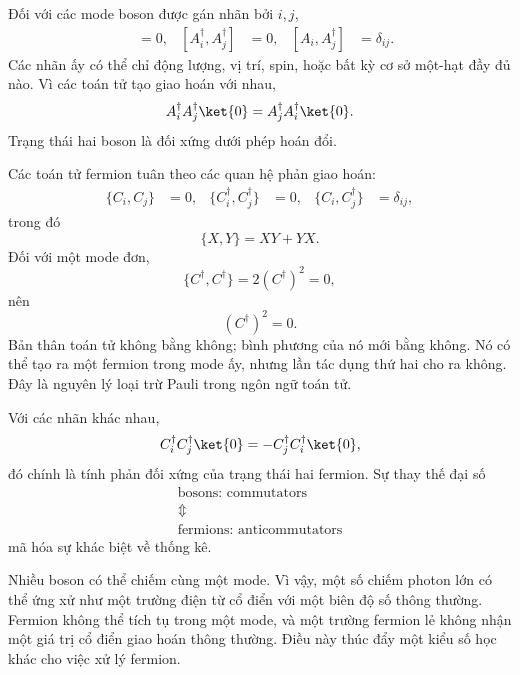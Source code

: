 Đối với các mode boson được gán nhãn bởi \(i,j\),
\begin{align}
[A_i,A_j]&=0,&
[A_i^\dagger,A_j^\dagger]&=0,&
[A_i,A_j^\dagger]&=\delta_{ij}.
\end{align}
Các nhãn ấy có thể chỉ động lượng, vị trí, spin, hoặc bất kỳ cơ sở một-hạt đầy đủ nào. Vì các toán tử tạo giao hoán với nhau,
\begin{equation}
A_i^\dagger A_j^\dagger\ket{0}
=A_j^\dagger A_i^\dagger\ket{0}.
\end{equation}
Trạng thái hai boson là đối xứng dưới phép hoán đổi.

Các toán tử fermion tuân theo các quan hệ phản giao hoán:
\begin{align}
\{C_i,C_j\}&=0,&
\{C_i^\dagger,C_j^\dagger\}&=0,&
\{C_i,C_j^\dagger\}&=\delta_{ij},
\end{align}
trong đó
\begin{equation}
\{X,Y\}=XY+YX.
\end{equation}
Đối với một mode đơn,
\begin{equation}
\{C^\dagger,C^\dagger\}=2(C^\dagger)^2=0,
\end{equation}
nên
\begin{equation}
(C^\dagger)^2=0.
\end{equation}
Bản thân toán tử không bằng không; bình phương của nó mới bằng không. Nó có thể tạo ra một fermion trong mode ấy, nhưng lần tác dụng thứ hai cho ra không. Đây là nguyên lý loại trừ Pauli trong ngôn ngữ toán tử.

Với các nhãn khác nhau,
\begin{equation}
C_i^\dagger C_j^\dagger\ket{0}
=-C_j^\dagger C_i^\dagger\ket{0},
\end{equation}
đó chính là tính phản đối xứng của trạng thái hai fermion. Sự thay thế đại số
\begin{equation}
\begin{gathered}
\text{bosons: commutators}\\
\Updownarrow\\
\text{fermions: anticommutators}
\end{gathered}
\end{equation}
mã hóa sự khác biệt về thống kê.

Nhiều boson có thể chiếm cùng một mode. Vì vậy, một số chiếm photon lớn có thể ứng xử như một trường điện từ cổ điển với một biên độ số thông thường. Fermion không thể tích tụ trong một mode, và một trường fermion lẻ không nhận một giá trị cổ điển giao hoán thông thường. Điều này thúc đẩy một kiểu số học khác cho việc xử lý fermion.

